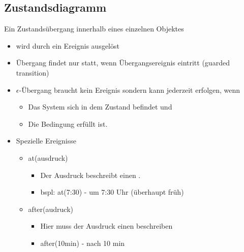 \subsection{Zustandsdiagramm}
Ein Zustandsübergang innerhalb eines einzelnen Objektes
\begin{itemize}
    \item wird durch ein Ereignis ausgelöst
    \item Übergang findet nur statt, wenn Übergangsereignis eintritt (guarded transition)
    \item $\epsilon$-Übergang braucht kein Ereignis sondern kann jederzeit erfolgen, wenn
    \begin{itemize}
        \item Das System sich in dem Zustand befindet und
        \item Die Bedingung erfüllt ist.
    \end{itemize}
    \item Spezielle Ereignisse
    \begin{itemize}
        \item at(ausdruck)
        \begin{itemize}
            \item Der Ausdruck beschreibt einen .
            \item bspl: at(7:30) - um 7:30 Uhr (überhaupt  früh)
        \end{itemize}
        \item after(audruck)
        \begin{itemize}
            \item Hier muss der Ausdruck einen  beschreiben
            \item after(10min) - nach 10 min
        \end{itemize}
    \end{itemize}
\end{itemize}

